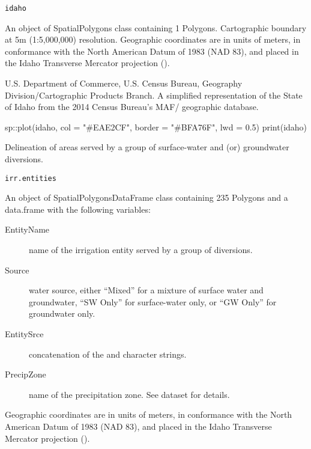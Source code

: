 \documentclass[a4paper]{book}
\begin{document}
%
\begin{Usage}
\begin{verbatim}
idaho
\end{verbatim}
\end{Usage}
%
\begin{Format}
An object of SpatialPolygons class containing 1 Polygons.
Cartographic boundary at 5m (1:5,000,000) resolution.
Geographic coordinates are in units of meters, in conformance with the
North American Datum of 1983 (NAD 83), and placed in the
Idaho Transverse Mercator projection ().
\end{Format}
%
\begin{Source}\relax
U.S. Department of Commerce, U.S. Census Bureau,
Geography Division/Cartographic Products Branch.
A simplified representation of the State of Idaho from the 2014 Census Bureau's
MAF/ geographic database.
\end{Source}
%
\begin{Examples}
\begin{ExampleCode}
sp::plot(idaho, col = "#EAE2CF", border = "#BFA76F", lwd = 0.5)
print(idaho)

\end{ExampleCode}
\end{Examples}
%
\begin{Description}\relax
Delineation of areas served by a group of surface-water and (or) groundwater diversions.
\end{Description}
%
\begin{Usage}
\begin{verbatim}
irr.entities
\end{verbatim}
\end{Usage}
%
\begin{Format}
An object of SpatialPolygonsDataFrame class containing 235 Polygons and
a data.frame with the following variables:
\begin{description}

\item[EntityName] name of the irrigation entity served by a group of diversions.
\item[Source] water source, either ``Mixed'' for a mixture of surface water and groundwater,
``SW Only'' for surface-water only, or ``GW Only'' for groundwater only.
\item[EntitySrce] concatenation of the  and  character strings.
\item[PrecipZone] name of the precipitation zone.
See  dataset for details.

\end{description}

Geographic coordinates are in units of meters, in conformance with the
North American Datum of 1983 (NAD 83), and placed in the
Idaho Transverse Mercator projection ().
\end{Format}
\end{document}
